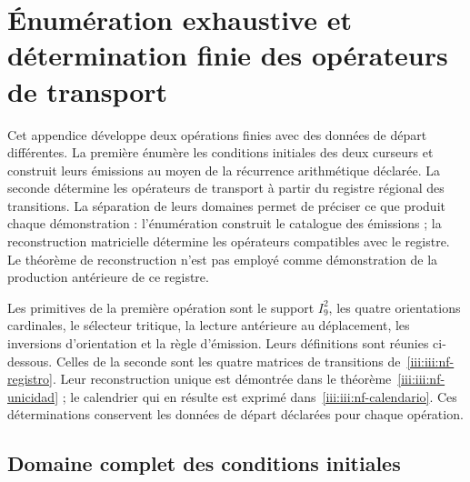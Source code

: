 \section{Énumération exhaustive et détermination finie des opérateurs de transport}
\label{iii:iii:nucleo-finito}

Cet appendice développe deux opérations finies avec des données de départ
différentes. La première énumère les conditions initiales des deux curseurs
et construit leurs émissions au moyen de la récurrence arithmétique déclarée.
La seconde détermine les opérateurs de transport à partir du registre
régional des transitions. La séparation de leurs domaines permet de préciser
ce que produit chaque démonstration : l’énumération construit le catalogue des
émissions ; la reconstruction matricielle détermine les opérateurs compatibles
avec le registre. Le théorème de reconstruction n’est pas employé comme démonstration
de la production antérieure de ce registre.

Les primitives de la première opération sont le support $I_9^2$, les quatre
orientations cardinales, le sélecteur tritique, la lecture antérieure au
déplacement, les inversions d’orientation et la règle d’émission.
Leurs définitions sont réunies ci-dessous. Celles de la seconde sont les
quatre matrices de transitions de~\eqref{iii:iii:nf-registro}.
Leur reconstruction unique est démontrée dans le
théorème~\ref{iii:iii:nf-unicidad} ; le calendrier qui en résulte est exprimé
dans~\eqref{iii:iii:nf-calendario}. Ces déterminations conservent
les données de départ déclarées pour chaque opération.

\subsection{Domaine complet des conditions initiales}

